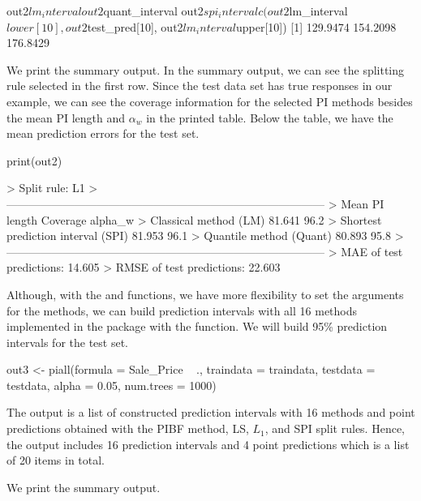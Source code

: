 \begin{example*}
out2$lm_interval
out2$quant_interval
out2$spi_interval
c(out2$lm_interval$lower[10], out2$test_pred[10], out2$lm_interval$upper[10])
[1] 129.9474 154.2098 176.8429
\end{example*}

We print the summary output. In the summary output, we can see the splitting rule selected in the first row. Since the test data set has true responses in our example, we can see the coverage information for the selected PI methods besides the mean PI length and $\alpha_w$ in the printed table. Below the table, we have the mean prediction errors for the test set.

\begin{example*}
print(out2)

>                    Split rule: L1
> ------------------------------------------------------------------------------------
>                                       Mean PI length      Coverage          alpha_w
> Classical method (LM)                     81.641            96.2%
> Shortest prediction interval (SPI)        81.953            96.1%
> Quantile method (Quant)                   80.893            95.8%
> ------------------------------------------------------------------------------------
>       MAE of test predictions: 14.605
>      RMSE of test predictions: 22.603
\end{example*}

Although, with the  and  functions, we have more flexibility to set the arguments for the methods, we can build prediction intervals with all 16 methods implemented in the package with the  function. We will build 95\% prediction intervals for the test set.

\begin{example*}
out3 <- piall(formula = Sale_Price ~ .,
              traindata = traindata, 
              testdata = testdata, 
              alpha = 0.05,
              num.trees = 1000)
\end{example*}

The output is a list of constructed prediction intervals with 16 methods and point predictions obtained with the PIBF method, LS, $L_1$, and SPI split rules. Hence, the output includes 16 prediction intervals and 4 point predictions which is a list of 20 items in total. 

We print the summary output.

